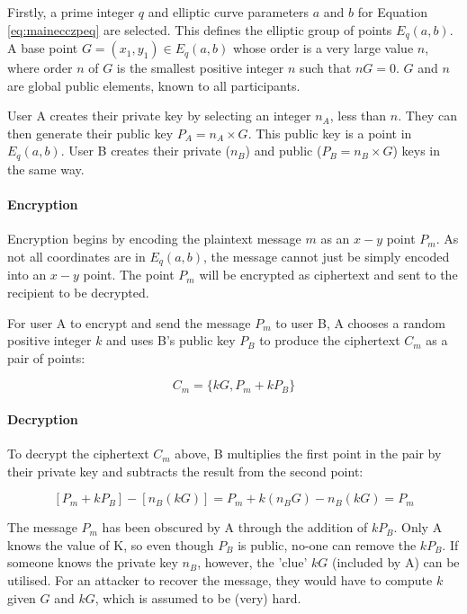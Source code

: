 \documentclass[a4paper,10pt]{report}
\begin{document}
Firstly, a prime integer $q$ and elliptic curve parameters $a$ and $b$ for Equation \ref{eq:mainecczpeq} are selected. This defines the elliptic group of points $E_{q}(a,b)$. A base point $G = (x_{1},y_{1}) \in E_{q}(a,b)$ whose order is a very large value $n$, where order $n$ of $G$ is the smallest positive integer $n$ such that $nG = 0$. $G$ and $n$ are global public elements, known to all participants. 

User A creates their private key by selecting an integer $n_{A}$, less than $n$. They can then generate their public key $P_{A} = n_{A} \times G$. This public key is a point in $E_{q}(a,b)$. User B creates their private ($n_{B}$) and public ($P_{B} = n_{B} \times G$) keys in the same way.

\paragraph{Encryption}

Encryption begins by encoding the plaintext message $m$ as an $x-y$ point $P_{m}$. As not all coordinates are in $E_{q}(a,b)$, the message cannot just be simply encoded into an $x-y$ point. The point $P_{m}$ will be encrypted as ciphertext and sent to the recipient to be decrypted. 

For user A to encrypt and send the message $P_{m}$ to user B, A chooses a random positive integer $k$ and uses B's public key $P_{B}$ to produce the ciphertext $C_{m}$ as a pair of points:

\[ C_{m} = \{kG , P_{m} + kP_{B}\} \]

\paragraph{Decryption}

To decrypt the ciphertext $C_{m}$ above, B multiplies the first point in the pair by their private key and subtracts the result from the second point:

\[ [P_{m} + kP_{B}] - [n_{B}(kG)] = P_{m} + k(n_{B}G) - n_{B}(kG) = P_{m} \]

The message $P_{m}$ has been obscured by A through the addition of $kP_{B}$. Only A knows the value of K, so even though $P_{B}$ is public, no-one can remove the $kP_{B}$. If someone knows the private key $n_{B}$, however, the 'clue' $kG$ (included by A) can be utilised. For an attacker to recover the message, they would have to compute $k$ given $G$ and $kG$, which is assumed to be (very) hard. 
\end{document}

